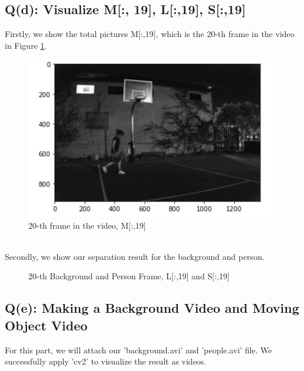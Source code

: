 \documentclass{article}
\begin{document}
\subsection{Q(d): Visualize M[:, 19], L[:,19], S[:,19]}
Firstly, we show the total pictures M[:,19], which is the 20-th frame in the video in Figure \ref{fig:qd1}.
\begin{figure}[!h]
	\centering
	\includegraphics[width=.35\textheight]{qd1.png}
	\caption{20-th frame in the video, M[:,19]}
	\label{fig:qd1}
\end{figure}
\\
Secondly, we show our separation result for the background and person.
\begin{figure}[!htbp]
	\centering
	\caption{20-th Background and Person Frame, L[:,19] and S[:,19]}
	\label{MPFH_hyperparameter} %
\end{figure}
\subsection{Q(e): Making a Background Video and Moving Object Video}
For this part, we will attach our 'background.avi' and 'people.avi' file. We successfully apply 'cv2' to visualize the result as videos.
\end{document}
